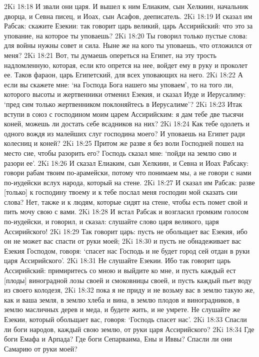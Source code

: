 2Ki 18:18  И звали они царя. И вышел к ним Елиаким, сын Хелкиин, начальник дворца, и Севна писец, и Иоах, сын Асафов, дееписатель.
2Ki 18:19  И сказал им Рабсак: скажите Езекии: так говорит царь великий, царь Ассирийский: что это за упование, на которое ты уповаешь?
2Ki 18:20  Ты говорил только пустые слова: для войны нужны совет и сила. Ныне же на кого ты уповаешь, что отложился от меня?
2Ki 18:21  Вот, ты думаешь опереться на Египет, на эту трость надломленную, которая, если кто опрется на нее, войдет ему в руку и проколет ее. Таков фараон, царь Египетский, для всех уповающих на него.
2Ki 18:22  А если вы скажете мне: `на Господа Бога нашего мы уповаем', то на того ли, которого высоты и жертвенники отменил Езекия, и сказал Иуде и Иерусалиму: `пред сим только жертвенником поклоняйтесь в Иерусалиме'?
2Ki 18:23  Итак вступи в союз с господином моим царем Ассирийским: я дам тебе две тысячи коней, можешь ли достать себе всадников на них?
2Ki 18:24  Как тебе одолеть и одного вождя из малейших слуг господина моего? И уповаешь на Египет ради колесниц и коней?
2Ki 18:25  Притом же разве я без воли Господней пошел на место сие, чтобы разорить его? Господь сказал мне: `пойди на землю сию и разори ее'.
2Ki 18:26  И сказал Елиаким, сын Хелкиин, и Севна и Иоах Рабсаку: говори рабам твоим по-арамейски, потому что понимаем мы, а не говори с нами по-иудейски вслух народа, который на стене.
2Ki 18:27  И сказал им Рабсак: разве [только] к господину твоему и к тебе послал меня господин мой сказать сии слова? Нет, также и к людям, которые сидят на стене, чтобы есть помет свой и пить мочу свою с вами.
2Ki 18:28  И встал Рабсак и возгласил громким голосом по-иудейски, и говорил, и сказал: слушайте слово царя великого, царя Ассирийского!
2Ki 18:29  Так говорит царь: пусть не обольщает вас Езекия, ибо он не может вас спасти от руки моей;
2Ki 18:30  и пусть не обнадеживает вас Езекия Господом, говоря: `спасет нас Господь и не будет город сей отдан в руки царя Ассирийского'.
2Ki 18:31  Не слушайте Езекии. Ибо так говорит царь Ассирийский: примиритесь со мною и выйдите ко мне, и пусть каждый ест [плоды] виноградной лозы своей и смоковницы своей, и пусть каждый пьет воду из своего колодезя,
2Ki 18:32  пока я не приду и не возьму вас в землю такую же, как и ваша земля, в землю хлеба и вина, в землю плодов и виноградников, в землю масличных дерев и меда, и будете жить, и не умрете. Не слушайте же Езекии, который обольщает вас, говоря: `Господь спасет нас'.
2Ki 18:33  Спасли ли боги народов, каждый свою землю, от руки царя Ассирийского?
2Ki 18:34  Где боги Емафа и Арпада? Где боги Сепарваима, Ены и Иввы? Спасли ли они Самарию от руки моей?
